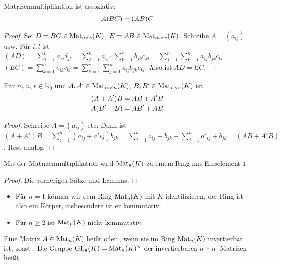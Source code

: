 \begin{lemma}
	Matrizenmultiplikation ist assoziativ:
	\begin{align}
		A(BC)=(AB)C\notag
	\end{align}
\end{lemma}
\begin{proof}
	Sei $D=BC\in \operatorname{Mat}_{n\times s}(K)$, $E=AB \in \operatorname{Mat}_{m\times r}(K)$. Schreibe $A=(a_{ij})$ usw. Für $i,l$ ist $(AD)=
	\sum_{j=1}^n a_{ij}d_{jl}=\sum_{j=1}^n a_{ij}\cdot \sum_{k=1}^r b_{jk}c_{kl}=\sum
	_{j=1}^n \sum_{k=1}^n a_{ij}b_{jk}c_{kl}$. \\
	$(EC)=\sum_{k=1}^n e_{ik}c_{kl}=\sum_{k=1}^r \sum_{j=1}^n a_{ij}b_{jk}c_{kl}$. Also ist 
	$AD=EC$.
\end{proof}

\begin{lemma}
	Für $m,n,r\in \mathbb N_0$ und $A,A'\in \operatorname{Mat}_{m\times n}(K)$, $B,B'\in \operatorname{Mat}_{n\times r}(K)$ ist
	 \begin{align}
	 	(A+A')B&=AB+A'B\notag \\
	 	A(B'+B)&=AB'+AB\notag
	 \end{align}
\end{lemma}
\begin{proof}
	Schreibe $A=(a_{ij})$ etc. Dann ist $(A+A')B=\sum_{j=1}^n (a_{ij}+a'{ij})b_{jk}=\sum_{j=1}^n 
	a_{ij}+b_{jk} + \sum_{j=1}^n a'_{ij}+b_{jk}=(AB+A'B)$. Rest analog.
\end{proof}

\begin{proposition}
	Mit der Matrizenmultiplikation wird $\operatorname{Mat}_n(K)$ zu einem Ring mit Einselement $1$.
\end{proposition}
\begin{proof}
	Die vorherigen Sätze und Lemmas.
\end{proof}

\begin{example}
	\begin{itemize}
		\item Für $n=1$ können wir dem Ring $\operatorname{Mat}_n(K)$ mit $K$ identifizieren, der Ring ist also ein Körper, 
		insbesondere ist er kommutativ.
		\item Für $n\ge 2$ ist $\operatorname{Mat}_n(K)$ nicht kommutativ.
	\end{itemize}
\end{example}

\begin{definition}[invertierbar]
	Eine Matrix $A\in \operatorname{Mat}_n(K)$ heißt  oder , wenn sie im Ring 
	$\operatorname{Mat}_n(K)$ invertierbar ist, sonst . Die Gruppe $\operatorname{GL}_n(K)=\operatorname{Mat}_n(K)^{\times}$ der invertierbaren $n\times n$
	-Matrizen heißt .
\end{definition}

